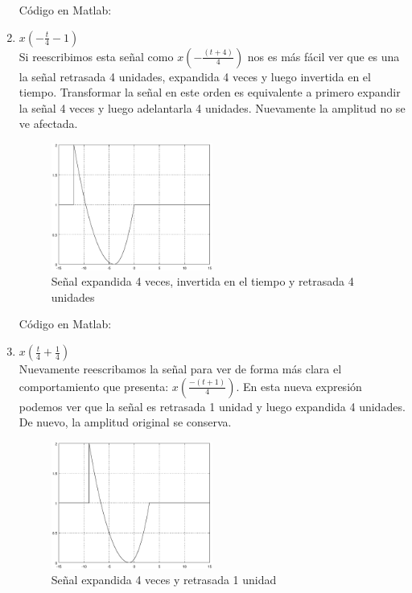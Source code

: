 \documentclass[10pt,a4paper]{report}
\begin{document}
\begin{enumerate}
Código en Matlab:
    
    
  \item $x\left(-\frac{t}{4}-1\right)$\\
  \newline Si reescribimos esta señal como $x\left(-\frac{\left(t+4\right)}{4}\right)$ nos es más fácil ver que es una la señal retrasada 4 unidades, expandida 4 veces y luego invertida en el tiempo. Transformar la señal en este orden es equivalente a primero expandir la señal 4 veces y luego adelantarla 4 unidades. Nuevamente la amplitud no se ve afectada.

    \begin{figure}[H]
      \begin{center}
        \includegraphics[width=0.5\textwidth]{Ejercicio2/IncisoC}
        \caption{Señal expandida 4 veces, invertida en el tiempo y retrasada 4 unidades}
        \label{fig:IncisoC}
      \end{center}
    \end{figure}
    
Código en Matlab:
    
    \newpage

  \item $x\left(\frac{t}{4}+\frac{1}{4}\right)$\\
  \newline Nuevamente reescribamos la señal para ver de forma más clara el comportamiento que presenta: $x\left(\frac{-\left(t+1\right)}{4}\right)$. En esta nueva expresión podemos ver que la señal es retrasada 1 unidad y luego expandida 4 unidades. De nuevo, la amplitud original se conserva.
    \begin{figure}[H]
      \begin{center}
        \includegraphics[width=0.5\textwidth]{Ejercicio2/IncisoD}
        \caption{Señal expandida 4 veces y retrasada 1 unidad}
        \label{fig:IncisoD}
      \end{center}
    \end{figure}
    

\end{enumerate}
\end{document}
